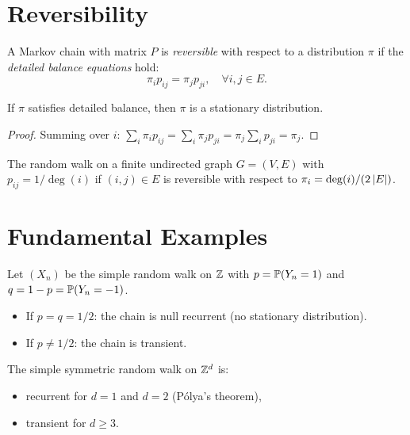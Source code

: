 \section{Reversibility}

\begin{definition}[Reversibility]
A Markov chain with matrix $P$ is \emph{reversible} with respect to a distribution
$\pi$ if the \emph{detailed balance equations} hold:
\[
  \pi_i p_{ij} = \pi_j p_{ji}, \quad \forall i, j \in E.
\]
\end{definition}

\begin{proposition}
If $\pi$ satisfies detailed balance, then $\pi$ is a stationary distribution.
\end{proposition}

\begin{proof}
Summing over $i$: $\sum_i \pi_i p_{ij} = \sum_i \pi_j p_{ji} = \pi_j \sum_i p_{ji} = \pi_j$.
\end{proof}

\begin{example}
The random walk on a finite undirected graph $G = (V, E)$ with
$p_{ij} = 1/\deg(i)$ if $(i,j) \in E$ is reversible with respect to
$\pi_i = \deg(i) / (2\left| E \right|)$.
\end{example}

\section{Fundamental Examples}

\begin{example}
Let $(X_n)$ be the simple random walk on $\mathbb{Z}$ with $p = \mathbb{P}(Y_n = 1)$ and
$q = 1 - p = \mathbb{P}(Y_n = -1)$.
\begin{itemize}
  \item If $p = q = 1/2$: the chain is null recurrent (no stationary distribution).
  \item If $p \neq 1/2$: the chain is transient.
\end{itemize}
\end{example}

\begin{example}
The simple symmetric random walk on $\mathbb{Z}^d$ is:
\begin{itemize}
  \item recurrent for $d = 1$ and $d = 2$ (P\'olya's theorem),
  \item transient for $d \geq 3$.
\end{itemize}
\end{example}

